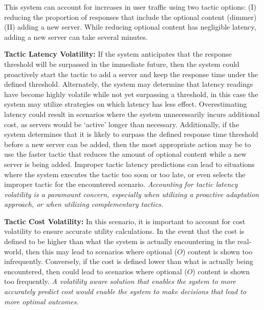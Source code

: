 \documentclass[12pt]{article}
\begin{document}
This system can account for increases in user traffic using two tactic options: (I) reducing the proportion of responses that include the optional content (dimmer) (II) adding a new server. While reducing optional content has negligible latency, adding a new server can take several minutes. %

\vspace{1mm} \noindent \textbf{Tactic Latency Volatility: }If the system anticipates that the response threshold will be surpassed in the immediate future, then the system could proactively start the tactic to add a server and keep the response time under the defined threshold. Alternately, the system may determine that latency readings have become highly volatile while not yet surpassing a threshold, in this case the system may utilize strategies on which latency has less effect. Overestimating latency could result in scenarios where the system unnecessarily incurs additional cost, as servers would be `active' longer than necessary. Additionally, if the system determines that it is likely to surpass the defined response time threshold before a new server can be added, then the most appropriate action may be to use the faster tactic that reduces the amount of optional content while a new server is being added. Improper tactic latency predictions can lead to situations where the system executes the tactic too soon or too late, or even selects the improper tactic for the encountered scenario. \emph{Accounting for tactic latency volatility is a paramount concern, especially when utilizing a proactive adaptation approach, or when utilizing complementary tactics.} %

\vspace{1mm} \noindent \textbf{Tactic Cost Volatility: }In this scenario, it is important to account for cost volatility to ensure accurate utility calculations. In the event that the cost is defined to be higher than what the system is actually encountering in the real-world, then this may lead to scenarios where optional ($O$) content is shown too infrequently. Conversely, if the cost is defined lower than what is actually being encountered, then could lead to scenarios where optional ($O$) content is shown too frequently. \emph{A volatility aware solution that enables the system to more accurately predict cost would enable the system to make decisions that lead to more optimal outcomes.}
\end{document}
